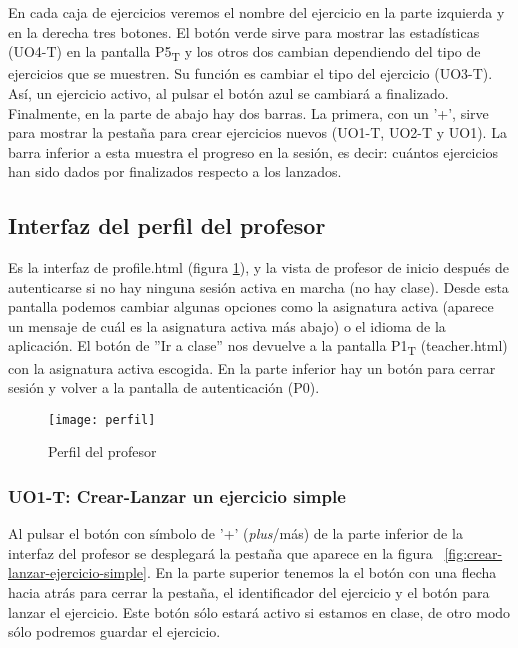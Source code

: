 En cada caja de ejercicios veremos el nombre del ejercicio en la parte izquierda y en la derecha tres botones. El botón verde sirve para mostrar las estadísticas (UO4-T) en la pantalla P5\textsubscript{T} y los otros dos cambian dependiendo del tipo de ejercicios que se muestren. Su función es cambiar el tipo del ejercicio (UO3-T). Así, un ejercicio activo, al pulsar el botón azul se cambiará a finalizado.\\

Finalmente, en la parte de abajo hay dos barras. La primera, con un '+', sirve para mostrar la pestaña para crear ejercicios nuevos (UO1-T, UO2-T y UO1). La barra inferior a esta muestra el progreso en la sesión, es decir: cuántos ejercicios han sido dados por finalizados respecto a los lanzados.\\

\subsection{Interfaz del perfil del profesor}
\label{diseno-e-implementacion:interfaces:perfil}

Es la interfaz de profile.html (figura \ref{fig:perfil}\label{fig:perfil}), y la vista de profesor de inicio después de autenticarse si no hay ninguna sesión activa en marcha (no hay clase). Desde esta pantalla podemos cambiar algunas opciones como la asignatura activa (aparece un mensaje de cuál es la asignatura activa más abajo) o el idioma de la aplicación. El botón de ''Ir a clase'' nos devuelve a la pantalla P1\textsubscript{T} (teacher.html) con la asignatura activa escogida. En la parte inferior hay un botón para cerrar sesión y volver a la pantalla de autenticación (P0).\\

\noindent
\begin{figure}[!htbp]
	\centering
	\texttt{[image: perfil]}
	\caption{Perfil del profesor}
	\label{fig:perfil}
\end{figure}

\subsubsection{UO1-T: Crear-Lanzar un ejercicio simple}
\label{diseno-e-implementacion:interfaces:profesor:uo1-t}

Al pulsar el botón con símbolo de '+' (\textit{plus}/más) de la parte inferior de la interfaz del profesor se desplegará la pestaña que aparece en la figura ~\ref{fig:crear-lanzar-ejercicio-simple}. En la parte superior tenemos la el botón con una flecha hacia atrás para cerrar la pestaña, el identificador del ejercicio y el botón para lanzar el ejercicio. Este botón sólo estará activo si estamos en clase, de otro modo sólo podremos guardar el ejercicio.\\

